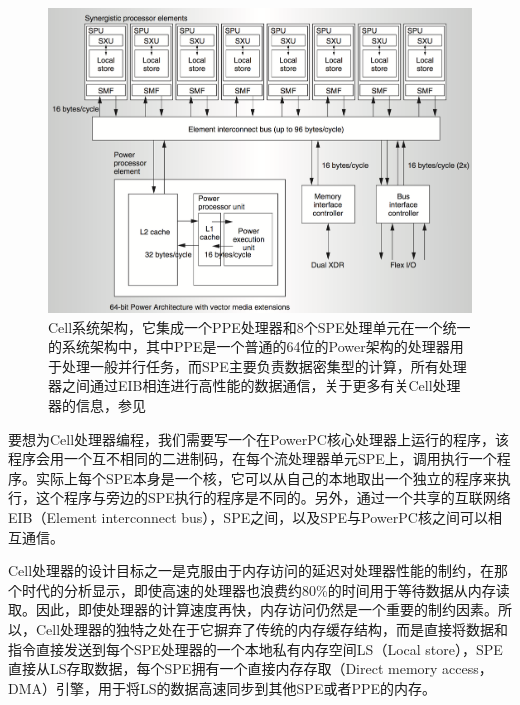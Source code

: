 \begin{figure}
\begin{fullwidth}
	\includegraphics[width=\thewidth]{figures/rp/cell-architecture}
	\caption{Cell系统架构，它集成一个PPE处理器和8个SPE处理单元在一个统一的系统架构中，其中PPE是一个普通的64位的Power架构的处理器用于处理一般并行任务，而SPE主要负责数据密集型的计算，所有处理器之间通过EIB相连进行高性能的数据通信，关于更多有关Cell处理器的信息，参见\cite{a:SynergisticProcessinginCellsMulticoreArchitecture}}
	\label{f:rp-cell}
\end{fullwidth}
\end{figure}

要想为Cell处理器编程，我们需要写一个在PowerPC核心处理器上运行的程序，该程序会用一个互不相同的二进制码，在每个流处理器单元SPE上，调用执行一个程序。实际上每个SPE本身是一个核，它可以从自己的本地取出一个独立的程序来执行，这个程序与旁边的SPE执行的程序是不同的。另外，通过一个共享的互联网络EIB（Element interconnect bus），SPE之间，以及SPE与PowerPC核之间可以相互通信。

Cell处理器的设计目标之一是克服由于内存访问的延迟对处理器性能的制约，在那个时代的分析显示，即使高速的处理器也浪费约80\%的时间用于等待数据从内存读取。因此，即使处理器的计算速度再快，内存访问仍然是一个重要的制约因素。所以，Cell处理器的独特之处在于它摒弃了传统的内存缓存结构，而是直接将数据和指令直接发送到每个SPE处理器的一个本地私有内存空间LS（Local store），SPE直接从LS存取数据，每个SPE拥有一个直接内存存取（Direct memory access，DMA）引擎，用于将LS的数据高速同步到其他SPE或者PPE的内存。

